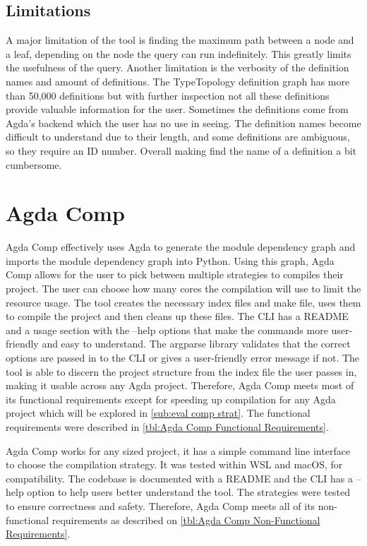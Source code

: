 \subsection{Limitations}

A major limitation of the tool is finding the maximum path between a node and a
leaf, depending on the node the query can run indefinitely. This greatly limits
the usefulness of the query. Another limitation is the verbosity of the
definition names and amount of definitions. The TypeTopology definition graph
has more than 50,000 definitions but with further inspection not all these
definitions provide valuable information for the user. Sometimes the
definitions come from Agda's backend which the user has no use in seeing. The
definition names become difficult to understand due to their length, and some
definitions are ambiguous, so they require an ID number. Overall making find
the name of a definition a bit cumbersome.


\section{Agda Comp} \label{sec:eval agda comp}

Agda Comp effectively uses Agda to generate the module dependency graph and
imports the module dependency graph into Python. Using this graph, Agda Comp
allows for the user to pick between multiple strategies to compiles their
project. The user can choose how many cores the compilation will use to limit
the resource usage. The tool creates the necessary index files and make file,
uses them to compile the project and then cleans up these files. The CLI has a
README and a usage section with the \textsf{--help} options that make the
commands more user-friendly and easy to understand. The argparse library
validates that the correct options are passed in to the CLI or gives a
user-friendly error message if not. The tool is able to discern the project
structure from the index file the user passes in, making it usable across any
Agda project. Therefore, Agda Comp meets most of its functional requirements
except for speeding up compilation for any Agda project which will be explored
in \cref{sub:eval comp strat}.  The functional requirements were
described in \cref{tbl:Agda Comp Functional Requirements}.

Agda Comp works for any sized project, it has a simple command line interface
to choose the compilation strategy. It was tested within WSL and macOS, for
compatibility. The codebase is documented with a README and the CLI has a
\textsf{--help} option to help users better understand the tool. The strategies
were tested to ensure correctness and safety. Therefore, Agda Comp meets all of
its non-functional requirements as described on \cref{tbl:Agda Comp
Non-Functional Requirements}.

